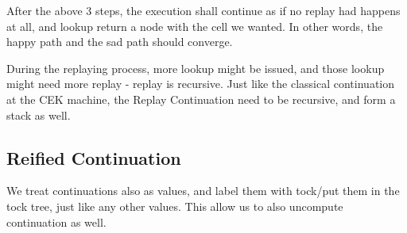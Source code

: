 After the above 3 steps, the execution shall continue as if no replay had happens at all, and lookup return a node with the cell we wanted. In other words, the happy path and the sad path should converge.

During the replaying process, more lookup might be issued, and those lookup might need more replay - replay is recursive. Just like the classical continuation at the CEK machine, the Replay Continuation need to be recursive, and form a stack as well.

\subsection{Reified Continuation}
We treat continuations also as values, and label them with tock/put them in the tock tree, just like any other values. This allow us to also uncompute continuation as well.